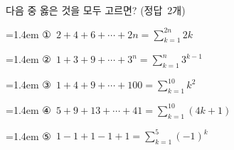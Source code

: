 다음 중 옳은 것을 모두 고르면? \mbox{(정답 2개)}
\par\medskip\par\noindent\hangindent=1.4em {\small ①}\ $2+4+6+\cdots+2n=\displaystyle\sum_{k=1}^{2n}2k$\par\noindent\hangindent=1.4em {\small ②}\ $1+3+9+\cdots+3^n=\displaystyle\sum_{k=1}^{n}3^{k-1}$\par\noindent\hangindent=1.4em {\small ③}\ $1+4+9+\cdots+100=\displaystyle\sum_{k=1}^{10}k^2$\par\noindent\hangindent=1.4em {\small ④}\ $5+9+13+\cdots+41=\displaystyle\sum_{k=1}^{10}(4k+1)$\par\noindent\hangindent=1.4em {\small ⑤}\ $1-1+1-1+1=\displaystyle\sum_{k=1}^{5}(-1)^k$\par\medskip
